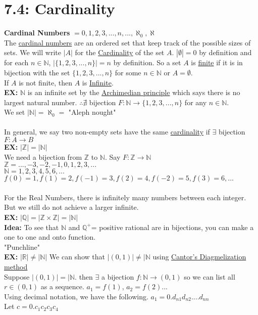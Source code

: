 \documentclass{article}
\begin{document}
		\section[04/19/28]{7.4: Cardinality}
		\textbf{Cardinal Numbers} $=0,1,2,3,...,n,...,\aleph_0,\aleph$\\
		The \underline{cardinal numbers} are an ordered set that keep track of the possible sizes of sets. We will write $|A|$ for the \underline{Cardinality} of the set $A$. $|\emptyset |=0$ by definition and for each $n\in\mathbb{N}$, $|\{1,2,3,...,n\}|=n$ by definition. So a set $A$ is \underline{finite} if it is in bijection with the set $\{1,2,3,...,n\}$ for some $n\in\mathbb{N}$ or $A=\emptyset$.\\
		If $A$ is not finite, then $A$ is \underline{Infinite}.\\
		\textbf{EX:} $\mathbb{N}$ is an infinite set by the \underline{Archimedian principle} which says there is no largest natural number. $\therefore \nexists$ bijection $F: \mathbb{N}\rightarrow\{1,2,3,...,n\}$ for any $n\in\mathbb{N}$.\\
		We set $|\mathbb{N}|=\aleph_0=$ "Aleph nought"\\
		\\
		In general, we say two non-empty sets have the same \underline{cardinality} if $\exists$ bijection $F:A\rightarrow B$\\
		\textbf{EX:} $|\mathbb{Z}| =|\mathbb{N}|$\\
		We need a bijection from $\mathbb{Z}$ to $\mathbb{N}$. Say $F:\mathbb{Z}\rightarrow\mathbb{N}$\\
		$\mathbb{Z} = ...,-3,-2,-1,0,1,2,3,...$\\
		$\mathbb{N} =1,2,3,4,5,6,...$\\
		$f(0)=1,f(1)=2,f(-1)=3,f(2)=4,f(-2)=5,f(3)=6,...$\\
		\\
		For the Real Numbers, there is infinitely many numbers between each integer. But we still do not achieve a larger infinite.\\
		\textbf{EX:} $|\mathbb{Q}|=|\mathbb{Z}\times\mathbb{Z}|=|\mathbb{N}|$\\
		\textbf{Idea:} To see that $\mathbb{N}$ and $\mathbb{Q^+}$= positive rational are in bijections, you can make a one to one and onto function.\\
		"Punchline"\\
		\textbf{EX:} $|\mathbb{R}|\neq|\mathbb{N}|$ We can show that $|(0,1)|\neq|\mathbb{N}$ using \underline{Cantor's Diagmelization method}\\
		Suppose $|(0,1)|=|\mathbb{N}$. then $\exists$ a bijection $f:\mathbb{N}\rightarrow (0,1)$ so we can list all $r\in(0,1)$ as a sequence. $a_1=f(1)$, $a_2=f(2)$...\\
		Using decimal notation, we have the following. $a_1=0.d_{n1}d_{n2}....d_{nn}$\\
		Let $c=0.c_1c_2c_3c_4$ 
\end{document}
